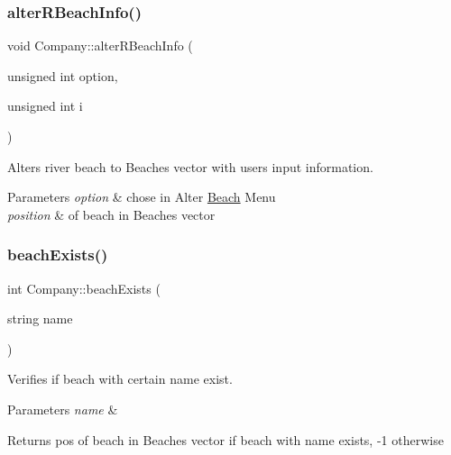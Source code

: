 \subsubsection{\texorpdfstring{alter\+R\+Beach\+Info()}{alterRBeachInfo()}}
{\footnotesize\ttfamily void Company\+::alter\+R\+Beach\+Info (\begin{DoxyParamCaption}\item[{unsigned int}]{option,  }\item[{unsigned int}]{i }\end{DoxyParamCaption})}



Alters river beach to Beaches\textquotesingle{} vector with user\textquotesingle{}s input information. 


\begin{DoxyParams}{Parameters}
{\em option} & chose in Alter \hyperlink{class_beach}{Beach} Menu \\
\hline
{\em position} & of beach in Beaches\textquotesingle{} vector \\
\hline
\end{DoxyParams}
\mbox{\label{class_company_afabcb7d6b8e6fdb49ce4c9352ac88287}} 
\subsubsection{\texorpdfstring{beach\+Exists()}{beachExists()}}
{\footnotesize\ttfamily int Company\+::beach\+Exists (\begin{DoxyParamCaption}\item[{string}]{name }\end{DoxyParamCaption})}



Verifies if beach with certain name exist. 


\begin{DoxyParams}{Parameters}
{\em name} & \\
\hline
\end{DoxyParams}
\begin{DoxyReturn}{Returns}
pos of beach in Beaches\textquotesingle{} vector if beach with name exists, -\/1 otherwise 
\end{DoxyReturn}
\mbox{\label{class_company_a7302f90a47eb6d2739270aa411c7a83d}} 
